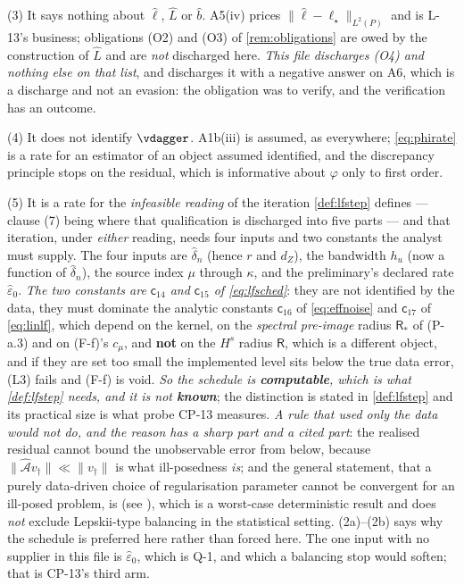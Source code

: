 \begin{remark}
(3) It says nothing about $\hat\ell$, $\hat L$ or $\hat b$. A5(iv) prices
$\|\hat\ell-\ell_\star\|_{L^{2}(P)}$ and is L-13's business; obligations \textup{(O2)} and
\textup{(O3)} of \cref{rem:obligations} are owed by the construction of $\hat L$ and are \emph{not}
discharged here. \emph{This file discharges \textup{(O4)} and nothing else on that list}, and
discharges it with a negative answer on A6, which is a discharge and not an evasion: the obligation was
to verify, and the verification has an outcome.

(4) It does not identify $\vdagger$. A1b(iii) is assumed, as everywhere; \eqref{eq:phirate} is a
rate for an estimator of an object assumed identified, and the discrepancy principle stops on the
residual, which is informative about $\varphi$ only to first order.

(5) It is a rate for the \emph{infeasible reading} of the iteration \cref{def:lfstep} defines --- clause
\textup{(7)} being where that qualification is discharged into five parts --- and that iteration, under
\emph{either} reading, needs four
inputs and two constants the analyst must supply. The four inputs are $\hat\delta_n$ (hence $r$ and
$d_Z$), the bandwidth $h_u$ (now a function of $\hat\delta_n$), the source index $\mu$ through
$\kappa$, and the preliminary's declared rate $\hat\varepsilon_0$. \emph{The two constants are
$\mathsf c_{14}$ and $\mathsf c_{15}$ of \eqref{eq:lfsched}}: they are not identified by the data, they
must dominate the analytic constants $\mathsf c_{16}$
of \eqref{eq:effnoise} and $\mathsf c_{17}$ of \eqref{eq:linlf}, which depend on the kernel, on the
\emph{spectral pre-image} radius $\mathsf R_\ast$ of (P-a.3) and on (F-f)'s $c_\mu$, and \textbf{not} on
the $H^{s}$ radius $\mathsf R$, which is a different object, and if they are set too small the implemented
level sits below the true data error, (L3) fails and (F-f) is void. \emph{So the schedule is
\textbf{computable}, which is what \cref{def:lfstep} needs, and it is not \textbf{known}}; the
distinction is stated in \cref{def:lfstep} and its practical size is what probe CP-13 measures.
\emph{A rule that used only the data would not do, and the reason has a sharp part and a cited part}:
the realised residual cannot bound the unobservable error from below, because
$\|\hat{\mathcal A}v_\dagger\|\ll\|v_\dagger\|$ is what ill-posedness \emph{is}; and the general
statement, that a purely data-driven choice of regularisation parameter cannot be convergent for an
ill-posed problem, is \citet{bakushinskii1984} (see \citet[\S3.3]{engl2000}), which is a worst-case
deterministic result and does \emph{not} exclude Lepskii-type balancing in the statistical setting.
(2a)--(2b) says why the schedule is preferred here rather than forced here. The one
input with no supplier in this file is $\hat\varepsilon_0$, which is Q-1, and which a balancing stop
would soften; that is CP-13's third arm.


\end{remark}
